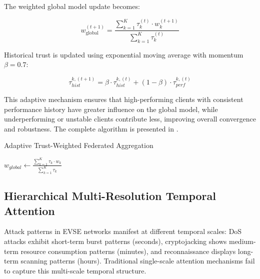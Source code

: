 The weighted global model update becomes:

\begin{equation}
	\label{equation:trust-weighted-update}
	w_{\text{global}}^{(t+1)} = \frac{\sum_{k=1}^{K} \tau_k^{(t)} \cdot w_k^{(t+1)}}{\sum_{k=1}^{K} \tau_k^{(t)}}
\end{equation}

Historical trust is updated using exponential moving average with momentum $\beta = 0.7$:

\begin{equation}
	\label{equation:historical-trust}
	\tau_{hist}^{k,(t+1)} = \beta \cdot \tau_{hist}^{k,(t)} + (1 - \beta) \cdot \tau_{perf}^{k,(t)}
\end{equation}

This adaptive mechanism ensures that high-performing clients with consistent performance history have greater influence on the global model, while underperforming or unstable clients contribute less, improving overall convergence and robustness. The complete algorithm is presented in .

\begin{algorithm}[H]
	\caption{Adaptive Trust-Weighted Federated Aggregation\vspace{0.25em}}
	\label{algorithm:trust-weighted-aggregation}
	\vspace*{3.5pt}
	{


		$w_{global} \leftarrow \frac{\sum_{k=1}^K \tau_k \cdot w_k}{\sum_{k=1}^K \tau_k}$ 

		\;
	}
\end{algorithm}

\subsection{Hierarchical Multi-Resolution Temporal Attention}
\label{subsection:multi-resolution-attention}
Attack patterns in EVSE networks manifest at different temporal scales: DoS attacks exhibit short-term burst patterns (seconds), cryptojacking shows medium-term resource consumption patterns (minutes), and reconnaissance displays long-term scanning patterns (hours). Traditional single-scale attention mechanisms fail to capture this multi-scale temporal structure. \\


